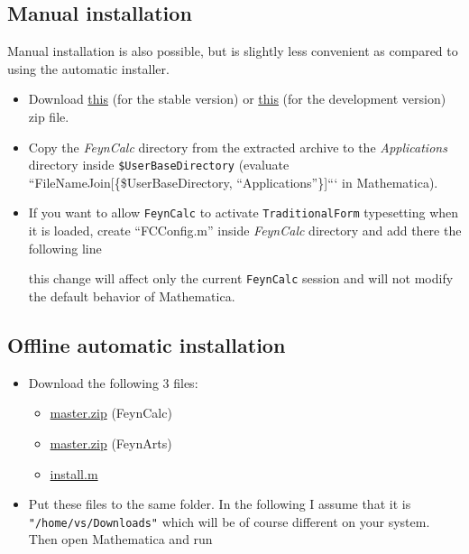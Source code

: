 \documentclass[../FeynCalcManual.tex]{subfiles}
\begin{document}
\hypertarget{manual-installation}{%
\subsection{Manual installation}\label{manual-installation}}

Manual installation is also possible, but is slightly less convenient as
compared to using the automatic installer.

\begin{itemize}
\item
  Download
  \href{https://github.com/FeynCalc/feyncalc/archive/hotfix-stable.zip}{this}
  (for the stable version) or
  \href{https://github.com/FeynCalc/feyncalc/archive/master.zip}{this}
  (for the development version) zip file.
\item
  Copy the \emph{FeynCalc} directory from the extracted archive to the
  \emph{Applications} directory inside \texttt{\$UserBaseDirectory}
  (evaluate ``FileNameJoin{[}\{\$UserBaseDirectory,
  ``Applications''\}{]}``` in Mathematica).
\item
  If you want to allow \texttt{FeynCalc} to activate
  \texttt{TraditionalForm} typesetting when it is loaded, create
  ``FCConfig.m'' inside \emph{FeynCalc} directory and add there the
  following line

\begin{Shaded}
\begin{Highlighting}[]
\ExtensionTok{=}\NormalTok{;}
\end{Highlighting}
\end{Shaded}

  this change will affect only the current \texttt{FeynCalc} session and
  will not modify the default behavior of Mathematica.
\end{itemize}

\hypertarget{offline-automatic-installation}{%
\subsection{Offline automatic
installation}\label{offline-automatic-installation}}

\begin{itemize}
\item
  Download the following 3 files:

  \begin{itemize}
  \tightlist
  \item
    \href{https://github.com/FeynCalc/feyncalc/archive/master.zip}{master.zip}
    (FeynCalc)
  \item
    \href{https://github.com/FeynCalc/feynarts-mirror/archive/master.zip}{master.zip}
    (FeynArts)
  \item
    \href{https://github.com/FeynCalc/feyncalc/raw/master/install.m}{install.m}
  \end{itemize}
\item
  Put these files to the same folder. In the following I assume that it
  is \texttt{"/home/vs/Downloads"} which will be of course different on
  your system. Then open Mathematica and run
\end{itemize}
\end{document}
